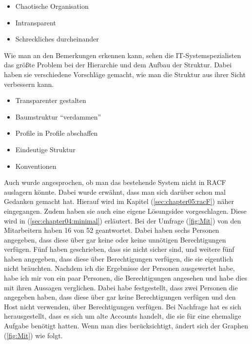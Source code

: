 \begin{itemize}
	\item Chaotische Organisation
	\item Intransparent
	\item Schreckliches durcheinander
\end{itemize}

Wie man an den Bemerkungen erkennen kann, sehen die IT-Systemspezialisten das größte Problem bei der Hierarchie und dem Aufbau der Struktur.
Dabei haben sie verschiedene Vorschläge gemacht, wie man die Struktur aus ihrer Sicht verbessern kann.

\begin{itemize}
	\item Transparenter gestalten
	\item Baumstruktur "`verdammen"'
	\item Profile in Profile abschaffen
	\item Eindeutige Struktur
	\item Konventionen
\end{itemize}
Auch wurde angesprochen, ob man das bestehende System nicht in RACF auslagern könnte.
Dabei wurde erwähnt, dass man sich darüber schon mal Gedanken gemacht hat.
Hierauf wird im Kapitel (\ref{sec:chapter05:racF}) näher eingegangen.
Zudem haben sie auch eine eigene Lösungsidee vorgeschlagen.
Diese wird in (\ref{sec:chapter04:minimal}) erläutert.
\newline
\newline
Bei der Umfrage (\ref{fig:Mit}) von den Mitarbeitern haben 16 von 52 geantwortet.
Dabei haben sechs Personen angegeben, dass diese über gar keine oder keine unnötigen Berechtigungen verfügen.
Fünf haben geschrieben, dass sie nicht sicher sind, und weitere fünf haben angegeben, dass diese über Berechtigungen verfügen, die sie eigentlich nicht bräuchten.
Nachdem ich die Ergebnisse der Personen ausgewertet habe, habe ich mir von ein paar Personen, die Berechtigungen angesehen und habe dies mit ihren Aussagen verglichen.
Dabei habe festgestellt, dass zwei Personen die angegeben haben, dass diese über gar keine Berechtigungen verfügen und den Host nicht verwenden, über Berechtigungen verfügen.
Bei Nachfrage hat es sich herausgestellt, dass es sich um alte Accounts handelt, die sie für eine ehemalige Aufgabe benötigt hatten.
Wenn man dies berücksichtigt, ändert sich der Graphen (\ref{fig:Mit}) wie folgt.
